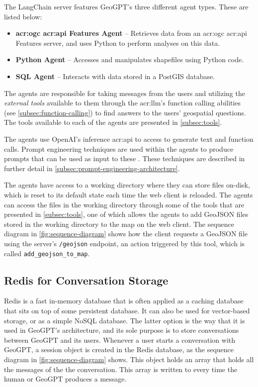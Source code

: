 The LangChain server features GeoGPT's three different agent types. These are listed below:

\begin{itemize}
    \item \textbf{\acrshort{acr:ogc} \acrshort{acr:api} Features Agent} -- Retrieves data from an \acrshort{acr:ogc} \acrshort{acr:api} Features server, and uses Python to perform analyses on this data.
    \item \textbf{Python Agent} -- Accesses and manipulates shapefiles using Python code.
    \item \textbf{SQL Agent} -- Interacts with data stored in a PostGIS database.
\end{itemize}

The agents are responsible for taking messages from the users and utilizing the \textit{external tools} available to them through the \acrshort{acr:llm}'s function calling abilities (see \autoref{subsec:function-calling}) to find answers to the users' geospatial questions. The tools available to each of the agents are presented in \autoref{subsec:tools}.

The agents use OpenAI's inference \acrshort{acr:api} to access  to generate text and function calls. Prompt engineering techniques are used within the agents to produce prompts that can be used as input to these . These techniques are described in further detail in \autoref{subsec:prompt-engineering-architecture}.

The agents have access to a working directory where they can store files on-disk, which is reset to its default state each time the web client is reloaded. The agents can access the files in the working directory through some of the tools that are presented in \autoref{subsec:tools}, one of which allows the agents to add GeoJSON files stored in the working directory to the map on the web client. The sequence diagram in \autoref{fig:sequence-diagram} shows how the client requests a GeoJSON file using the server's \texttt{/geojson} endpoint, an action triggered by this tool, which is called \texttt{add\_geojson\_to\_map}.


\subsection{Redis for Conversation Storage}
\label{subsec:redis-architecture}

Redis \citep{sanfilippoRedisRealtimeData2009} is a fast in-memory database that is often applied as a caching database that sits on top of some persistent database. It can also be used for vector-based storage, or as a simple NoSQL database. The latter option is the way that it is used in GeoGPT's architecture, and its sole purpose is to store conversations between GeoGPT and its users. Whenever a user starts a conversation with GeoGPT, a session object is created in the Redis database, as the sequence diagram in \autoref{fig:sequence-diagram} shows. This object holds an array that holds all the messages of the the conversation. This array is written to every time the human or GeoGPT produces a message.

